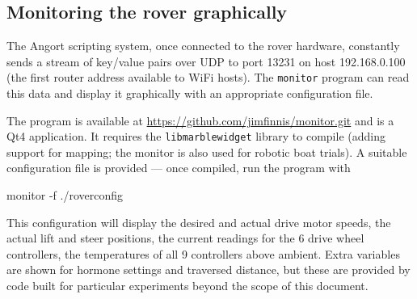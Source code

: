 \subsection{Monitoring the rover graphically}
The Angort scripting system, once connected to the rover hardware, constantly sends a stream of key/value
pairs over UDP to port 13231 on host 192.168.0.100 (the first router address available to WiFi hosts). 
The \texttt{monitor} program can read this data and display it graphically with an appropriate configuration
file.

The program is available at \url{https://github.com/jimfinnis/monitor.git} and is a Qt4 application. It
requires the \texttt{libmarblewidget} library to compile (adding support for mapping; the monitor
is also used for robotic boat trials). A suitable configuration file is provided --- once compiled, run
the program with
\begin{v}
monitor -f ./roverconfig
\end{v}
This configuration will display the desired and actual drive motor speeds, the actual lift and
steer positions, the current readings for the 6 drive wheel controllers, the temperatures of all
9 controllers above ambient. Extra variables are shown for hormone settings and traversed distance,
but these are provided by code built for particular experiments beyond the scope of this document.
